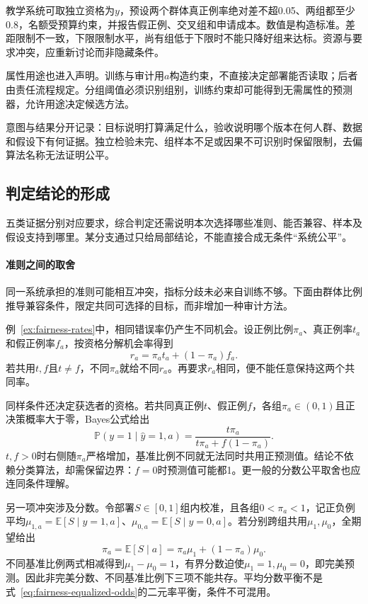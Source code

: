 教学系统可取独立资格为$y$，预设两个群体真正例率绝对差不超0.05、两组都至少0.8，名额受预算约束，并报告假正例、交叉组和申请成本。数值是构造标准。差距限制不一致，下限限制水平，尚有组低于下限时不能只降好组来达标。资源与要求冲突，应重新讨论而非隐藏条件。

属性用途也进入声明。训练与审计用$a$构造约束，不直接决定部署能否读取；后者由责任流程规定。分组阈值必须识别组别，训练约束却可能得到无需属性的预测器，允许用途决定候选方法。

意图与结果分开记录：目标说明打算满足什么，验收说明哪个版本在何人群、数据和假设下有何证据。独立检验未完、组样本不足或因果不可识别时保留限制，去偏算法名称无法证明公平。

\subsection{判定结论的形成}
\label{sec:fairness-compatibility}

五类证据分别对应要求，综合判定还需说明本次选择哪些准则、能否兼容、样本及假设支持到哪里。某分支通过只给局部结论，不能直接合成无条件“系统公平”。

\paragraph{准则之间的取舍}

同一系统承担的准则可能相互冲突，指标分歧未必来自训练不够。下面由群体比例推导兼容条件，限定共同可选择的目标，而非增加一种审计方法。

例~\ref{ex:fairness-rates}中，相同错误率仍产生不同机会。设正例比例$\pi_a$、真正例率$t_a$和假正例率$f_a$，按资格分解机会率得到
\[
 r_a=\pi_a t_a+(1-\pi_a)f_a.
\]
若共用$t,f$且$t\ne f$，不同$\pi_a$就给不同$r_a$。再要求$r_a$相同，便不能任意保持这两个共同率。

同样条件还决定获选者的资格。若共同真正例$t$、假正例$f$，各组$\pi_a\in(0,1)$且正决策概率大于零，Bayes公式给出
\begin{equation}
 \mathbb P(y=1\mid\hat y=1,a)
 =\frac{t\pi_a}{t\pi_a+f(1-\pi_a)}.
 \label{eq:fairness-predictive-value}
\end{equation}
$t,f>0$时右侧随$\pi_a$严格增加，基准比例不同就无法同时共用正预测值。结论不依赖分类算法，却需保留边界：$f=0$时预测值可能都1。更一般的分数公平取舍也应连同条件理解。

另一项冲突涉及分数。令部署$S\in[0,1]$组内校准，且各组$0<\pi_a<1$，记正负例平均$\mu_{1,a}=\mathbb E[S\mid y=1,a]$、$\mu_{0,a}=\mathbb E[S\mid y=0,a]$。若分别跨组共用$\mu_1,\mu_0$，全期望给出
\[
 \pi_a=\mathbb E[S\mid a]
       =\pi_a\mu_1+(1-\pi_a)\mu_0.
\]
不同基准比例两式相减得到$\mu_1-\mu_0=1$，有界分数迫使$\mu_1=1,\mu_0=0$，即完美预测。因此非完美分数、不同基准比例下三项不能共存。平均分数平衡不是式~\eqref{eq:fairness-equalized-odds}的二元率平衡，条件不可混用。

